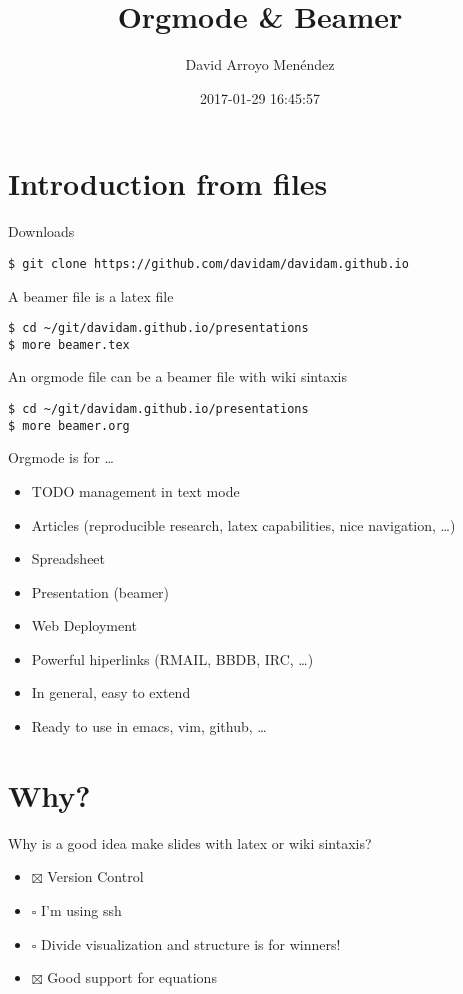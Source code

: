 \documentclass[unicode,presentation,c,squeeze,shrink,10pt]{beamer}
\author{David Arroyo Menéndez}
\date{2017-01-29 16:45:57}
\title{Orgmode \& Beamer}
\begin{document}
\maketitle

\section{Introduction from files}
\label{sec-1}
\begin{frame}[fragile,label=sec-1-1]{Downloads}
 \begin{verbatim}
$ git clone https://github.com/davidam/davidam.github.io
\end{verbatim}
\end{frame}
\begin{frame}[fragile,label=sec-1-2]{A beamer file is a latex file}
 \begin{verbatim}
$ cd ~/git/davidam.github.io/presentations
$ more beamer.tex
\end{verbatim}
\end{frame}
\begin{frame}[fragile,label=sec-1-3]{An orgmode file can be a beamer file with wiki sintaxis}
 \begin{verbatim}
$ cd ~/git/davidam.github.io/presentations
$ more beamer.org
\end{verbatim}
\end{frame}
\begin{frame}[label=sec-1-4]{Orgmode is for \ldots{}}
\begin{itemize}
\item TODO management in text mode
\item Articles (reproducible research, latex capabilities, nice navigation, \ldots{})
\item Spreadsheet
\item Presentation (beamer)
\item Web Deployment
\item Powerful hiperlinks (RMAIL, BBDB, IRC, \ldots{})
\item In general, easy to extend
\item Ready to use in emacs, vim, github, \ldots{}
\end{itemize}
\end{frame}
\section{Why?}
\label{sec-2}
\begin{frame}[label=sec-2-1]{Why is a good idea make slides with latex or wiki sintaxis?}
\begin{itemize}
\item $\boxtimes$ Version Control
\item $\square$ I'm using ssh
\item $\square$ Divide visualization and structure is for winners!
\item $\boxtimes$ Good support for equations
\end{itemize}
\end{frame}
\end{document}
